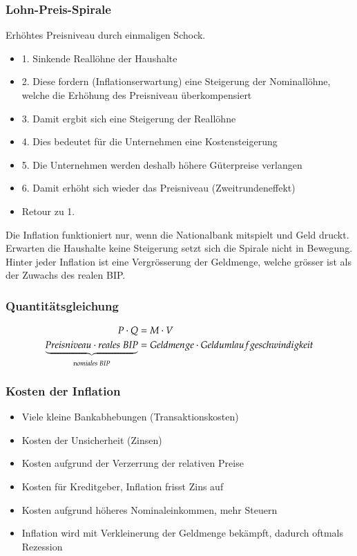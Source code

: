 \subsubsection{Lohn-Preis-Spirale}
Erhöhtes Preisniveau durch einmaligen Schock.
\begin{itemize}
	\item 1. Sinkende Reallöhne der Haushalte
	\item 2. Diese fordern (Inflationserwartung) eine Steigerung der Nominallöhne, welche die Erhöhung des Preisniveau überkompensiert
	\item 3. Damit ergbit sich eine Steigerung der Reallöhne
	\item 4. Dies bedeutet für die Unternehmen eine Kostensteigerung
	\item 5. Die Unternehmen werden deshalb höhere Güterpreise verlangen
	\item 6. Damit erhöht sich wieder das Preisniveau (Zweitrundeneffekt)
	\item Retour zu 1.
\end{itemize}
Die Inflation funktioniert nur, wenn die Nationalbank mitspielt und Geld druckt. Erwarten die Haushalte keine Steigerung setzt sich die Spirale nicht in Bewegung. Hinter jeder Inflation ist eine Vergrösserung der Geldmenge, welche grösser ist als der Zuwachs des realen BIP. 
\vspace{-0.5cm}
\subsubsection{Quantitätsgleichung}
\vspace{-1cm}
\begin{align*} 
    P \cdot Q &= M \cdot V\\
	\underbrace{Preisniveau \cdot reales \; BIP}_{\text nomiales \; BIP} &= Geldmenge \cdot Geldumlaufgeschwindigkeit
\end{align*}
\subsubsection{Kosten der Inflation}
\begin{itemize}
	\item Viele kleine Bankabhebungen (Transaktionskosten)
	\item Kosten der Unsicherheit (Zinsen)
	\item Kosten aufgrund der Verzerrung der relativen Preise
	\item Kosten für Kreditgeber, Inflation frisst Zins auf
	\item Kosten aufgrund höheres Nominaleinkommen, mehr Steuern
	\item Inflation wird mit Verkleinerung der Geldmenge bekämpft, dadurch oftmals Rezession
\end{itemize}
